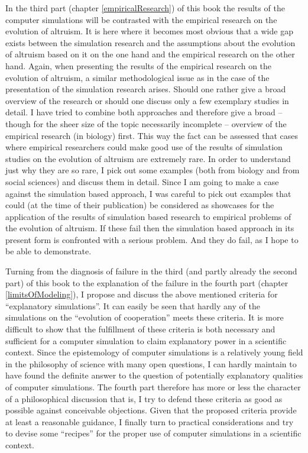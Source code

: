 
In the third part (chapter \ref{empiricalResearch}) of this book the results
of the computer simulations will be contrasted with the empirical research on
the evolution of altruism. It is here where it becomes most obvious that a
wide gap exists between the simulation research and the assumptions about the
evolution of altruism based on it on the one hand and the empirical research
on the other hand. Again, when presenting the results of the empirical
research on the evolution of altruism, a similar methodological issue as in
the case of the presentation of the simulation research arises. Should one
rather give a broad overview of the research or should one discuss only a few
exemplary studies in detail. I have tried to combine both approaches and
therefore give a broad -- though for the sheer size of the topic necessarily
incomplete -- overview of the empirical research (in biology) first.  
This way the fact can be assessed that cases where empirical researchers could make good use of the results of simulation studies on the evolution of altruism are extremely rare.
In order to understand just why they are so rare, I pick out some
examples (both from biology and from social sciences) and discuss them in
detail. Since I am going to make a case against the simulation based approach,
I was careful to pick out examples that could (at the time of their
publication) be considered as showcases for the application of the results of
simulation based research to empirical problems of the evolution of
altruism. If these fail then the simulation based approach in its present form
is confronted with a serious problem. And they do fail, as I hope to be able to
demonstrate.

Turning from the diagnosis of failure in the third (and partly already the
second part) of this book to the explanation of the failure in the fourth part
(chapter \ref{limitsOfModeling}), I propose and discuss the above
mentioned criteria for ``explanatory simulations''. It can easily be seen that
hardly any of the simulations on the ``evolution of cooperation'' meets these
criteria. It is more difficult to show that the fulfillment of these criteria
is both necessary and sufficient for a computer simulation to claim
explanatory power in a scientific context. Since the epistemology of computer
simulations is a relatively young field in the philosophy of science with many
open questions, I can hardly maintain to have found the definite answer to the
question of potentially explanatory qualities of computer simulations. The
fourth part therefore has more or less the character of a philosophical
discussion that is, I try to defend these criteria as good as possible
against conceivable objections. Given that the proposed criteria provide at
least a reasonable guidance, I finally turn to practical considerations and try
to devise some ``recipes'' for the proper use of computer simulations in a
scientific context.

